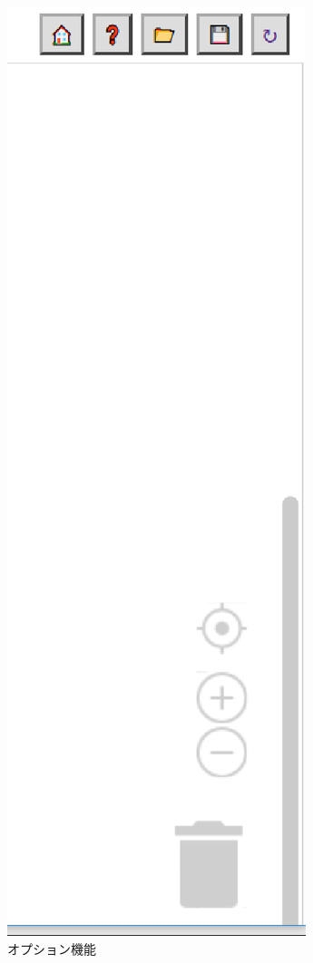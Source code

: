 \documentclass{risepaper}
\begin{document}
\begin{figure}[h]
\begin{center}
\includegraphics[scale=0.5]{img/option.eps}
\caption{オプション機能}%
\label{fig:blockly_option}
\end{center}%
\end{figure}%
\end{document}
